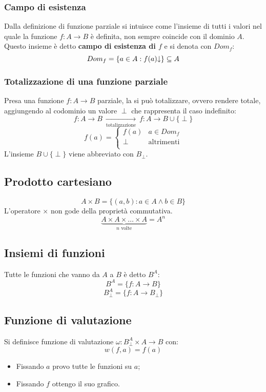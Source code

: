 \subsubsection*{Campo di esistenza}
Dalla definizione di funzione parziale si intuisce come l'insieme di tutti i valori
nel quale la funzione $f:A\rightarrow B$ è definita, non sempre coincide con il dominio
$A$. Questo insieme è detto \textbf{campo di esistenza di $f$} e si denota con $Dom_f$:
$$ Dom_f = \{ a\in A: f(a)\text{\textdownarrow} \} \subseteq  A $$

\subsubsection*{Totalizzazione di una funzione parziale}
Presa una funzione $f:A\rightarrow B$ parziale, la si può totalizzare, ovvero rendere
totale, aggiungendo al codominio un valore $\perp$ che rappresenta il caso indefinito:
$$ f:A\rightarrow B \ \underset{\text{totalizzazione}}{\longrightarrow} \ 
f:A\rightarrow B \cup \{\perp\}$$
$$ f(a) = \begin{cases}
f(a) & a\in Dom_f\\
\perp & \text{altrimenti}\\
\end{cases} $$
L'insieme $B \cup \{\perp\}$ viene abbreviato con $B_\perp$.

\subsection*{Prodotto cartesiano}
$$ A\times B = \{(a,b):a\in A \wedge b\in B\} $$
L'operatore $\times$ non gode della proprietà commutativa.
$$ \underbrace{A\times A\times\dots\times A}_{n \text{ volte}} = A^n $$

\subsection*{Insiemi di funzioni}
Tutte le funzioni che vanno da $A$ a $B$ è detto $B^A$:
$$ B^A = \{f:A\rightarrow B\} $$
$$ B^A_\perp = \{f:A\rightarrow B_\perp\} $$

\subsection*{Funzione di valutazione}
Si definisce funzione di valutazione $\omega:B_\perp^A\times A \rightarrow B$ con:
$$ w(f,a) = f(a) $$
\begin{itemize}
    \item Fissando $a$ provo tutte le funzioni su $a$;
    \item Fissando $f$ ottengo il suo grafico.
\end{itemize}